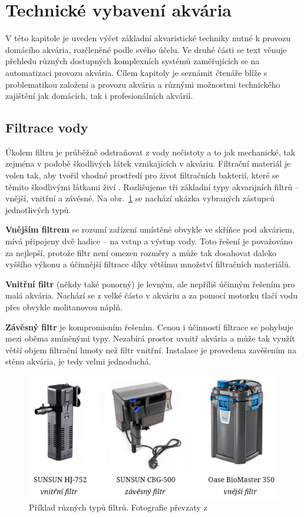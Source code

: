 \section{Technické vybavení akvária}
    V této kapitole je uveden výčet základní akvaristické techniky nutné k provozu domácího akvária, rozčleněné podle svého účelu. Ve druhé části se text věnuje přehledu různých dostupných komplexních systémů zaměřujících se na automatizaci provozu akvária. Cílem kapitoly je seznámit čtenáře blíže s problematikou založení a provozu akvária a různými možnostmi technického zajištění jak domácích, tak i profesionálních akvárií.
    \subsection{Filtrace vody}
        Úkolem filtru je průběžně odstraňovat z vody nečistoty a to jak mechanické, tak zejména v podobě škodlivých látek vznikajících v akváriu. Filtrační materiál je volen tak, aby tvořil vhodné prostředí pro život filtračních bakterií, které se těmito škodlivými látkami živí \cite{yt-filtrace}. Rozlišujeme tři základní typy akvarijních filtrů -- vnější, vnitřní a závěsné. Na obr.~\ref{fig:filtry-srovnani} se nachází ukázka vybraných zástupců jednotlivých typů.
        
        \textbf{Vnějším filtrem} se rozumí zařízení umístěné obvykle ve skříňce pod akváriem, mívá připojeny dvě hadice -- na vstup a výstup vody. Toto řešení je považováno za nejlepší, protože filtr není omezen rozměry a může tak dosahovat daleko vyššího výkonu a účinnější filtrace díky většímu množství filtračních materiálů. 

        \textbf{Vnitřní filtr} (někdy také ponorný) je levným, ale nepříliš účinným řešením pro malá akvária. Nachází se z velké částo v akváriu a za pomocí motorku tlačí vodu přes obvykle molitanovou náplň.

        \textbf{Závěsný filtr}  je kompromisním řešením.  Cenou i účinností filtrace se pohybuje mezi oběma zmíněnými typy. Nezabírá prostor uvnitř akvária a může tak využít větší objem filtrační hmoty než filtr vnitřní. Instalace je provedena zavěšením na stěnu akvária, je tedy velmi jednoduchá. 

        \begin{figure}[h!]
            \centering
            \includegraphics[width=\textwidth]{obrazky/filtry/filtry.jpg}
            \caption{Příklad různých typů filtrů. Fotografie převzaty z \cite{eshop-rostlinna-akvaria}}
            \label{fig:filtry-srovnani}
        \end{figure}

